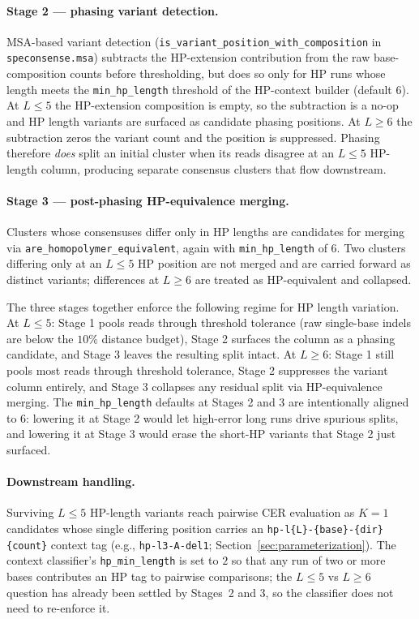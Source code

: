 \documentclass[11pt]{article}
\begin{document}
\paragraph{Stage 2 --- phasing variant detection.} MSA-based variant
detection (\texttt{is\_variant\_position\_with\_composition} in
\texttt{speconsense.msa}) subtracts the HP-extension contribution from the
raw base-composition counts before thresholding, but does so only for HP runs
whose length meets the \texttt{min\_hp\_length} threshold of the HP-context
builder (default $6$). At $L \leq 5$ the HP-extension composition is empty,
so the subtraction is a no-op and HP length variants are surfaced as candidate
phasing positions. At $L \geq 6$ the subtraction zeros the variant count and
the position is suppressed. Phasing therefore \emph{does} split an initial
cluster when its reads disagree at an $L \leq 5$ HP-length column, producing
separate consensus clusters that flow downstream.

\paragraph{Stage 3 --- post-phasing HP-equivalence merging.} Clusters whose
consensuses differ only in HP lengths are candidates for merging via
\texttt{are\_homopolymer\_equivalent}, again with \texttt{min\_hp\_length} of
$6$. Two clusters differing only at an $L \leq 5$ HP position are not merged
and are carried forward as distinct variants; differences at $L \geq 6$ are
treated as HP-equivalent and collapsed.

The three stages together enforce the following regime for HP length
variation. At $L \leq 5$: Stage 1 pools reads through threshold tolerance
(raw single-base indels are below the $10\%$ distance budget), Stage 2
surfaces the column as a phasing candidate, and Stage 3 leaves the resulting
split intact. At $L \geq 6$: Stage 1 still pools most reads through threshold
tolerance, Stage 2 suppresses the variant column entirely, and Stage 3
collapses any residual split via HP-equivalence merging. The
\texttt{min\_hp\_length} defaults at Stages 2 and 3 are intentionally aligned
to $6$: lowering it at Stage 2 would let high-error long runs drive spurious
splits, and lowering it at Stage 3 would erase the short-HP variants that
Stage 2 just surfaced.

\paragraph{Downstream handling.} Surviving $L \leq 5$ HP-length variants
reach pairwise CER evaluation as $K = 1$ candidates whose single differing
position carries an \texttt{hp-l\{L\}-\{base\}-\{dir\}\{count\}} context tag
(e.g., \texttt{hp-l3-A-del1}; Section~\ref{sec:parameterization}). The
context classifier's \texttt{hp\_min\_length} is set to $2$ so that any run
of two or more bases contributes an HP tag to pairwise comparisons; the
$L \leq 5$ vs $L \geq 6$ question has already been settled by Stages~2 and
3, so the classifier does not need to re-enforce it.
\end{document}
